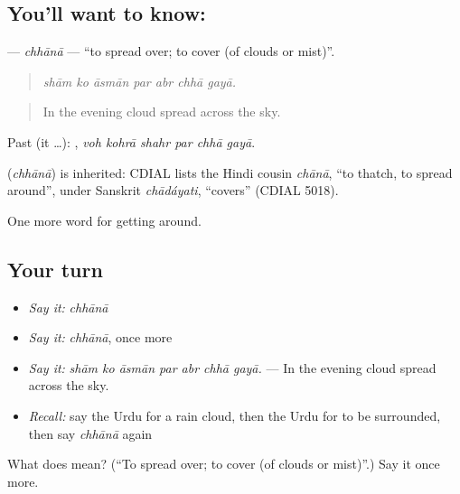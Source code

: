 \subsection*{You'll want to know: }
\textbf{} — \emph{chhānā} — \textquotedblleft{}to spread over; to cover (of clouds or mist)\textquotedblright{}.

\begin{quote}
      
\end{quote}

\begin{quote}
\emph{shām ko āsmān par abr chhā gayā.}
\end{quote}

\begin{quote}
In the evening cloud spread across the sky.
\end{quote}

Past (it …):      , \emph{voh kohrā shahr par chhā gayā}.

\begin{cousinweb}
\textbf{} (\emph{chhānā}) is inherited: CDIAL lists the Hindi cousin \emph{chānā}, \textquotedblleft{}to thatch, to spread around\textquotedblright{}, under Sanskrit \emph{chādáyati}, \textquotedblleft{}covers\textquotedblright{} (CDIAL 5018).
\end{cousinweb}

\begin{grammarlens}[title={What you've built}]
One more word for getting around.
\end{grammarlens}

\subsection*{Your turn}
\begin{itemize}
\raggedright
  \item \emph{Say it:} \emph{chhānā}
  \item \emph{Say it:} \emph{chhānā}, once more
  \item \emph{Say it:} \emph{shām ko āsmān par abr chhā gayā.} — In the evening cloud spread across the sky.
  \item \emph{Recall:} say the Urdu for a rain cloud, then the Urdu for to be surrounded, then say \emph{chhānā} again
\end{itemize}

\begin{tcolorbox}[breakable,colback=teal!4,colframe=teal!35!black,title={Before you move on}]
What does  mean? (\textquotedblleft{}To spread over; to cover (of clouds or mist)\textquotedblright{}.) Say it once more.
\end{tcolorbox}
